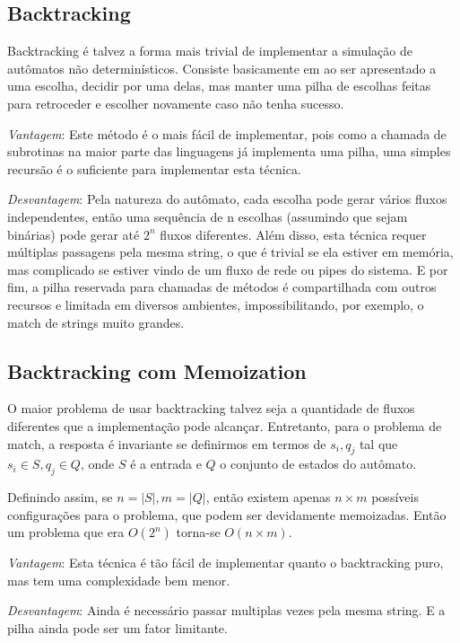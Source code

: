 \documentclass[a4paper,12pt,oneside,onecolumn]{uerj}
\begin{document}
\subsection{Backtracking}

Backtracking é talvez a forma mais trivial de implementar a simulação de autômatos não determinísticos. Consiste basicamente em ao ser apresentado a uma escolha, decidir por uma delas, mas manter uma pilha de escolhas feitas para retroceder e escolher novamente caso não tenha sucesso.

\emph{Vantagem}: Este método é o mais fácil de implementar, pois como a chamada de subrotinas na maior parte das linguagens já implementa uma pilha, uma simples recursão é o suficiente para implementar esta técnica.

\emph{Desvantagem}: Pela natureza do autômato, cada escolha pode gerar vários fluxos independentes, então uma sequência de n escolhas (assumindo que sejam binárias) pode gerar até $2^n$ fluxos diferentes. Além disso, esta técnica requer múltiplas passagens pela mesma string, o que é trivial se ela estiver em memória, mas complicado se estiver vindo de um fluxo de rede ou pipes do sistema. E por fim, a pilha reservada para chamadas de métodos é compartilhada com outros recursos e limitada em diversos ambientes, impossibilitando, por exemplo, o match de strings muito grandes.

\subsection{Backtracking com Memoization}

O maior problema de usar backtracking talvez seja a quantidade de fluxos diferentes que a implementação pode alcançar. Entretanto, para o problema de match, a resposta é invariante se definirmos em termos de $s_i, q_j$ tal que $s_i \in S, q_j \in Q$, onde $S$ é a entrada e $Q$ o conjunto de estados do autômato.

Definindo assim, se $n = |S|, m = |Q|$, então existem apenas $n \times m$ possíveis configurações para o problema, que podem ser devidamente memoizadas. Então um problema que era $O(2^n)$ torna-se $O(n\times m)$.

\emph{Vantagem}: Esta técnica é tão fácil de implementar quanto o backtracking puro, mas tem uma complexidade bem menor.

\emph{Desvantagem}: Ainda é necessário passar multiplas vezes pela mesma string. E a pilha ainda pode ser um fator limitante.
\end{document}
